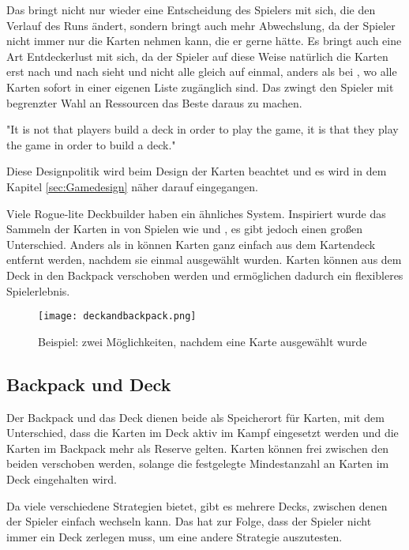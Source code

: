 Das bringt nicht nur wieder eine Entscheidung des Spielers mit sich, die den Verlauf des Runs ändert, sondern bringt auch mehr Abwechslung,
da der Spieler nicht immer nur die Karten nehmen kann, die er gerne hätte. Es bringt auch eine Art Entdeckerlust mit sich, da der Spieler
auf diese Weise natürlich die Karten erst nach und nach sieht und nicht alle gleich auf einmal, anders als bei \zB {},
wo alle Karten sofort in einer eigenen Liste zugänglich sind.  Das zwingt den Spieler mit begrenzter Wahl an Ressourcen das Beste daraus zu machen.

"It is not that players build a deck in order to play the game, it is that they play the game in order to build a deck."%


Diese Designpolitik wird beim Design der Karten beachtet und es wird in dem Kapitel \ref{sec:Gamedesign} näher darauf eingegangen.


Viele Rogue-lite Deckbuilder haben ein ähnliches System. Inspiriert wurde das Sammeln der Karten in \FF von Spielen wie  und ,
es gibt jedoch einen großen Unterschied. Anders als in \zB {} können Karten ganz einfach aus dem Kartendeck entfernt werden, nachdem sie einmal ausgewählt wurden.
Karten können aus dem Deck in den Backpack verschoben werden und ermöglichen dadurch ein flexibleres Spielerlebnis.


\begin{figure}[H]
    \texttt{[image: deckandbackpack.png]}
    \caption{Beispiel: zwei Möglichkeiten, nachdem eine Karte ausgewählt wurde}
\end{figure}%

\subsection{Backpack und Deck}\label{backpack_and_deck}

Der Backpack und das Deck dienen beide als Speicherort für Karten, mit dem Unterschied, dass die Karten im Deck aktiv im
Kampf eingesetzt werden und die Karten im Backpack mehr als Reserve gelten.
Karten können frei zwischen den beiden verschoben werden, solange die festgelegte Mindestanzahl an Karten im Deck eingehalten wird.


Da \FF viele verschiedene Strategien bietet, gibt es mehrere Decks, zwischen denen der Spieler einfach wechseln kann.
Das hat zur Folge, dass der Spieler nicht immer ein Deck zerlegen muss, um eine andere Strategie auszutesten.

